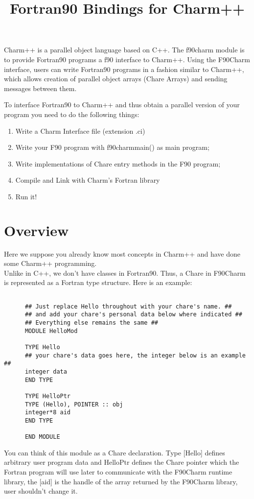 \documentclass[11pt]{article}
\title{Fortran90 Bindings for Charm++}
\begin{document}
\maketitle

Charm++ is a parallel object language based on C++. The f90charm module is to
provide Fortran90 programs a f90 interface to Charm++. Using the F90Charm interface,
users can write Fortran90 programs in a fashion similar to Charm++, which allows
creation of parallel object arrays (Chare Arrays) and sending messages between 
them.

To interface Fortran90 to Charm++ and thus obtain a parallel version of your 
program you need to do the following things:
\begin{enumerate}
\item Write a Charm Interface file (extension .ci)
\item Write your F90 program with f90charmmain() as main program;
\item Write implementations of Chare entry methods in the F90 program;
\item Compile and Link with Charm's Fortran library
\item Run it!
\end{enumerate}

\section{Overview}

Here we suppose you already know most concepts in Charm++ and have done some 
Charm++ programming. \\
Unlike in C++, we don't have classes in Fortran90. Thus, a Chare in F90Charm is 
represented as a Fortran type structure. Here is an example:

\begin{verbatim}

      ## Just replace Hello throughout with your chare's name. ##
      ## and add your chare's personal data below where indicated ##
      ## Everything else remains the same ##
      MODULE HelloMod

      TYPE Hello
      ## your chare's data goes here, the integer below is an example ##
      integer data
      END TYPE

      TYPE HelloPtr
      TYPE (Hello), POINTER :: obj
      integer*8 aid
      END TYPE

      END MODULE
\end{verbatim}
You can think of this module as a Chare declaration. Type [Hello] defines 
arbitrary user program data and HelloPtr defines the Chare pointer which the
Fortran program will use later to communicate with the F90Charm runtime 
library, the [aid] is the handle of the array returned by the F90Charm library, user 
shouldn't change it.
\end{document}
